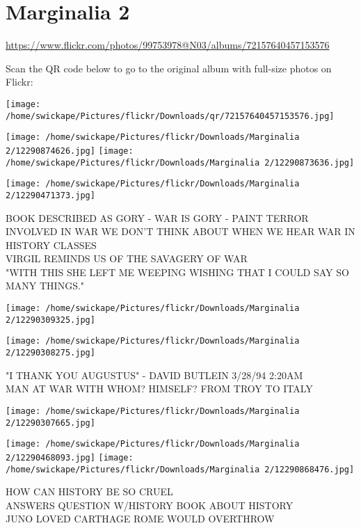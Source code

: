 \documentclass[10pt,letterpaper]{article}
\title{}
\author{}
\date{}
\begin{document}
\section*{Marginalia 2}

\url{https://www.flickr.com/photos/99753978@N03/albums/72157640457153576}

Scan the QR code below to go to the original album with full-size photos on Flickr:

\texttt{[image: /home/swickape/Pictures/flickr/Downloads/qr/72157640457153576.jpg]}
\pagebreak

\texttt{[image: /home/swickape/Pictures/flickr/Downloads/Marginalia 2/12290874626.jpg]}
\texttt{[image: /home/swickape/Pictures/flickr/Downloads/Marginalia 2/12290873636.jpg]}

\vspace{0.25in}
\texttt{[image: /home/swickape/Pictures/flickr/Downloads/Marginalia 2/12290471373.jpg]}

BOOK DESCRIBED AS GORY {-} WAR IS GORY {-} PAINT TERROR INVOLVED IN WAR WE DON'T THINK ABOUT WHEN WE HEAR WAR IN HISTORY CLASSES\\
VIRGIL REMINDS US OF THE SAVAGERY OF WAR\\
"WITH THIS SHE LEFT ME WEEPING WISHING THAT I COULD SAY SO MANY THINGS."
\pagebreak

\texttt{[image: /home/swickape/Pictures/flickr/Downloads/Marginalia 2/12290309325.jpg]}

\vspace{0.25in}
\texttt{[image: /home/swickape/Pictures/flickr/Downloads/Marginalia 2/12290308275.jpg]}

"I THANK YOU AUGUSTUS" {-} DAVID BUTLEIN 3/28/94 2:20AM\\
MAN AT WAR WITH WHOM? HIMSELF? FROM TROY TO ITALY
\pagebreak

\texttt{[image: /home/swickape/Pictures/flickr/Downloads/Marginalia 2/12290307665.jpg]}

\vspace{0.25in}
\texttt{[image: /home/swickape/Pictures/flickr/Downloads/Marginalia 2/12290468093.jpg]}
\texttt{[image: /home/swickape/Pictures/flickr/Downloads/Marginalia 2/12290868476.jpg]}

HOW CAN HISTORY BE SO CRUEL\\
ANSWERS QUESTION W/HISTORY BOOK ABOUT HISTORY\\
JUNO LOVED CARTHAGE ROME WOULD OVERTHROW
\pagebreak
\end{document}
